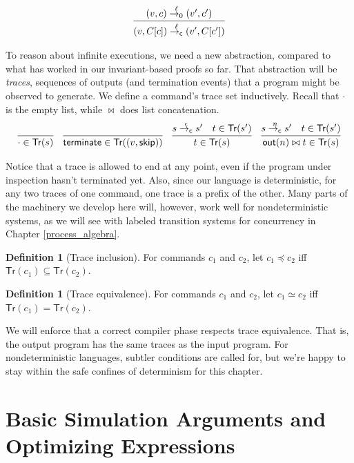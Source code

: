 \documentclass{amsbook}
\theoremstyle{definition}
\newtheorem{definition}[theorem]{Definition}
\theoremstyle{remark}
\numberwithin{section}{chapter}
\numberwithin{equation}{chapter}
\begin{document}
$$\infer{\smallstepcl{(v, C[c])}{\ell}{(v', C[c'])}}{
  \smallstepol{(v, c)}{\ell}{(v', c')}
}$$

\newcommand{\Tr}[1]{\mathsf{Tr}(#1)}
\newcommand{\terminate}[0]{\mathsf{terminate}}

To reason about infinite executions, we need a new abstraction, compared to what has worked in our invariant-based proofs so far.
That abstraction will be \emph{traces}, sequences of outputs (and termination events) that a program might be observed to generate.
We define a command's trace set inductively.
Recall that $\cdot$ is the empty list, while $\bowtie$ does list concatenation.
$$\infer{\cdot \in \Tr{s}}{}
\quad \infer{\terminate \in \Tr{(v, \skipe)}}{}
\quad \infer{t \in \Tr{s}}{
  \smallstepcl{s}{\silent}{s'}
  & t \in \Tr{s'}
}
\quad \infer{\concat{\outp{n}}{t} \in \Tr{s}}{
  \smallstepcl{s}{n}{s'}
  & t \in \Tr{s'}
}$$

Notice that a trace is allowed to end at any point, even if the program under inspection hasn't terminated yet.
Also, since our language is deterministic, for any two traces of one command, one trace is a prefix of the other.
Many parts of the machinery we develop here will, however, work well for nondeterministic systems, as we will see with labeled transition systems for concurrency in Chapter \ref{process_algebra}.

\newcommand{\trinc}[2]{#1 \preceq #2}
\newcommand{\treq}[2]{#1 \simeq #2}

\begin{definition}[Trace inclusion]
  For commands $c_1$ and $c_2$, let $\trinc{c_1}{c_2}$ iff $\Tr{c_1} \subseteq \Tr{c_2}$.
\end{definition}

\begin{definition}[Trace equivalence]
  For commands $c_1$ and $c_2$, let $\treq{c_1}{c_2}$ iff $\Tr{c_1} = \Tr{c_2}$.
\end{definition}

We will enforce that a correct compiler phase respects trace equivalence.
That is, the output program has the same traces as the input program.
For nondeterministic languages, subtler conditions are called for, but we're happy to stay within the safe confines of determinism for this chapter.


\section{Basic Simulation Arguments and Optimizing Expressions}
\end{document}
